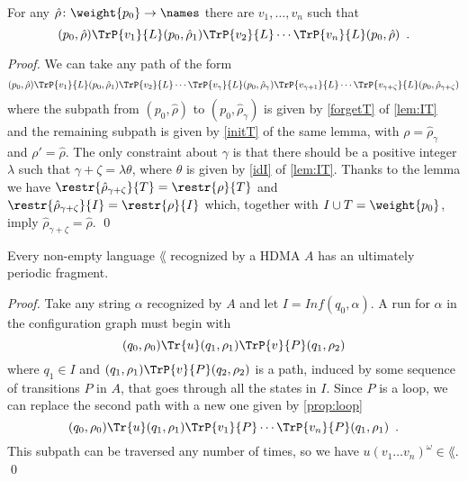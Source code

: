 \newcommand{\rrho}{\hat \rho}
\begin{proposition}
\label{prop:loop}

For any $\hat{\rho} \colon \weight{p_0} \to \names$ there are $v_1,\dots,v_n$ such that
\[
	(p_0, \rrho) \TrP{v_1}{L} (p_0, \rrho_1) \TrP{v_2}{L} \cdots \TrP{v_n}{L} (p_0,\rrho) \enspace .
\]
\end{proposition}

\begin{proof}
We can take any path of the form
\[
	(p_0,\rrho) \TrP{v_1}{L} (p_0,\rrho_1) \TrP{v_2}{L} \cdots \TrP{v_{\gamma}}{L} (p_0,\rrho_\gamma) \TrP{v_{\gamma+1}}{L} \cdots \TrP{v_{\gamma + \zeta}}{L} (p_0,\rrho_{\gamma + 
	 \zeta})
\]
where the subpath from $(p_0,\rrho)$ to $(p_0,\rrho_\gamma)$ is given by \ref{forgetT} of \cref{lem:IT} and the remaining subpath is given by \ref{initT} of the same lemma, with $\rho = \rrho_\gamma$ and $\rho' = \rrho$. The only constraint about $\gamma$ is that there should be a positive integer $\lambda$ such that $\gamma + \zeta = \lambda \theta$, where $\theta$ is given by \ref{idI} of \cref{lem:IT}. Thanks to the lemma we have $\restr{\rrho_{\gamma + \zeta}}{T} = \restr{\rho}{T}$ and 
$\restr{\rrho_{\gamma + \zeta}}{I} = \restr{\rho}{I}$ which, together with $I \cup T = \weight{p_0}$, imply $\rrho_{\gamma + \zeta} = \rrho$.
\qed
\end{proof}


\begin{theorem}
Every non-empty language $\lang$ recognized by a HDMA $A$ has an ultimately periodic fragment.
\end{theorem}
\begin{proof}

Take any string $\alpha$ recognized by $A$ and let $I = Inf(q_0,\alpha)$. A run for $\alpha$ in the configuration graph must  begin with
\[
	(q_0,\rho_0) \Tr{u} (q_1,\rho_1) \TrP{v}{P} (q_1,\rho_2)
\]
where $q_1 \in I$ and $(q_1,\rho_1) \TrP{v}{P} (q_2,\rho_2)$ is a path, induced by some sequence of transitions $P$ in $A$, that goes through all the states in $I$. Since $P$ is a loop, we can replace the second path with a new one given by \cref{prop:loop} 
\[
	(q_0,\rho_0) \Tr{u} (q_1,\rho_1) \TrP{v_1}{P} \cdots \TrP{v_n}{P} (q_1,\rho_1) \enspace .
\]
This subpath can be traversed any number of times, so we have $u(v_1\dots v_n)^\omega \in \lang$.
\qed
\end{proof}
